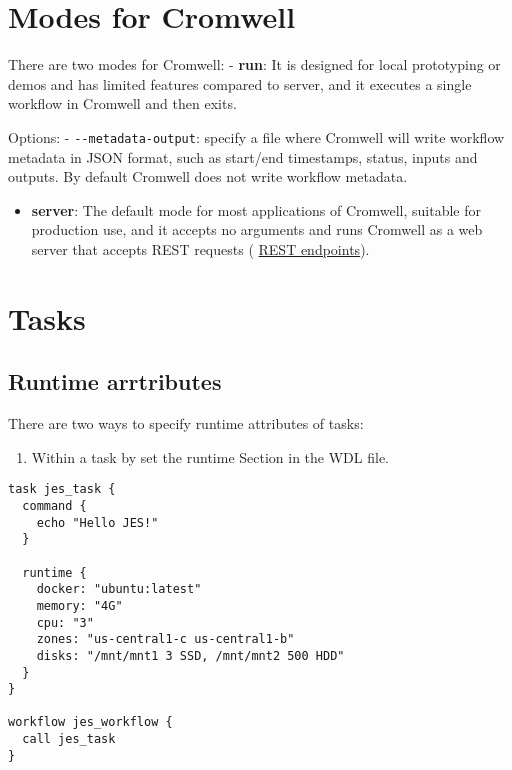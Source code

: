 \documentclass[
]{book}
\providecommand{\tightlist}{%
  \setlength{\itemsep}{0pt}\setlength{\parskip}{0pt}}
\begin{document}
\hypertarget{modes-for-cromwell}{%
\section{Modes for Cromwell}\label{modes-for-cromwell}}

There are two modes for Cromwell:
- \textbf{run}: It is designed for local prototyping or demos and has limited
features compared to server, and it executes a single workflow in Cromwell and
then exits.

Options:
- \texttt{-\/-metadata-output}: specify a file where Cromwell will write workflow
metadata in JSON format, such as start/end timestamps, status, inputs and
outputs. By default Cromwell does not write workflow metadata.

\begin{itemize}
\tightlist
\item
  \textbf{server}: The default mode for most applications of Cromwell, suitable for
  production use, and it accepts no arguments and runs Cromwell as a web server
  that accepts REST requests (
  \href{https://cromwell.readthedocs.io/en/stable/api/RESTAPI}{REST endpoints}).
\end{itemize}

\hypertarget{tasks-1}{%
\section{Tasks}\label{tasks-1}}

\hypertarget{runtime-arrtributes}{%
\subsection{Runtime arrtributes}\label{runtime-arrtributes}}

There are two ways to specify runtime attributes of tasks:

\begin{enumerate}
\def\labelenumi{\arabic{enumi}.}
\tightlist
\item
  Within a task by set the runtime Section in the WDL file.
\end{enumerate}

\begin{verbatim}
task jes_task {
  command {
    echo "Hello JES!"
  }
  
  runtime {
    docker: "ubuntu:latest"
    memory: "4G"
    cpu: "3"
    zones: "us-central1-c us-central1-b"
    disks: "/mnt/mnt1 3 SSD, /mnt/mnt2 500 HDD"
  }
}

workflow jes_workflow {
  call jes_task
}
\end{verbatim}
\end{document}
